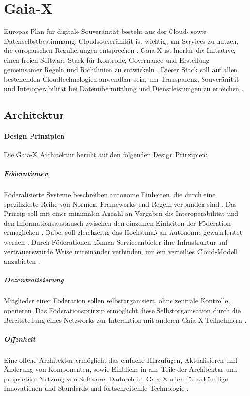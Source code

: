 \section{Gaia-X}
\label{sec:grundlagen:gaia-x}
Europas Plan für digitale Souveränität besteht aus der Cloud- sowie Datenselbstbestimmung.
Cloudsouveränität ist wichtig, um Services zu nutzen, die europäischen Regulierungen entsprechen \cite{Braud2021}.
Gaia-X ist hierfür die Initiative, einen freien Software Stack für Kontrolle, Governance und Erstellung gemeinsamer
Regeln und Richtlinien zu entwickeln \cite{Bonfiglio2021}. 
Dieser Stack soll auf allen bestehenden Cloudtechnologien anwendbar sein, um Transparenz, Souveränität und 
Interoperabilität bei Datenübermittlung und Dienstleistungen zu erreichen \cite{Bonfiglio2021}.

\subsection{Architektur}
\label{subsec:gaia-x:architektur}
\paragraph{Design Prinzipien}
Die Gaia-X Architektur beruht auf den folgenden Design Prinzipien:

\subparagraph{Föderationen}
Föderalisierte Systeme beschreiben autonome Einheiten, die durch eine spezifizierte Reihe von Normen,
Frameworks und Regeln verbunden sind \cite{GaiaXArchitecture2021}.
Das Prinzip soll mit einer minimalen Anzahl an Vorgaben die Interoperabilität und den Informationsaustausch
zwischen den einzelnen Einheiten der Föderation ermöglichen \cite{GaiaXArchitecture2021}. 
Dabei soll gleichzeitig das Höchstmaß an Autonomie gewährleistet werden \cite{GaiaXArchitecture2021}.
Durch Föderationen können Serviceanbieter ihre Infrastruktur auf vertrauenswürde Weise miteinander verbinden,
um ein verteiltes Cloud-Modell anzubieten \cite{Bonfiglio2021}.

\subparagraph{Dezentralisierung}
Mitglieder einer Föderation sollen selbstorganisiert, ohne zentrale Kontrolle, operieren.
Das Föderationsprinzip ermöglicht diese Selbstorganisation durch die Bereitstellung eines Netzworks
zur Interaktion mit anderen Gaia-X Teilnehmern \cite{GaiaXArchitecture2021}.

\subparagraph{Offenheit}
Eine offene Architektur ermöglicht das einfache Hinzufügen, Aktualisieren und Änderung von Komponenten, sowie
Einblicke in alle Teile der Architektur und proprietäre Nutzung von Software.
Dadurch ist Gaia-X offen für zukünftige Innovationen und Standards und fortschreitende Technologie \cite{GaiaXArchitecture2021}.

